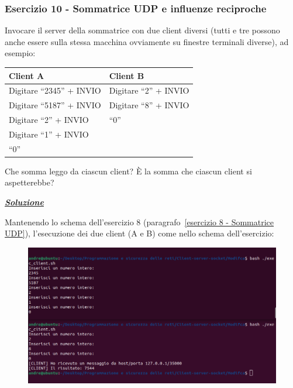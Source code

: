 \documentclass[a4paper]{article}
\newcommand{\dquotes}[1]{``#1''}
\begin{document}
	\subsubsection{Esercizio 10 - Sommatrice UDP e influenze reciproche}\label{esercizio 10 - Sommatrice UDP e influenze reciproche}
	
	Invocare il server della sommatrice con due client diversi (tutti e tre possono anche essere sulla stessa macchina ovviamente su finestre terminali diverse), ad esempio:
	\begin{table}[!htbp]
		\centering
		\begin{tabular}{@{} l | l @{}}
			\toprule
			\textbf{Client A} & \textbf{Client B} \\
			\midrule
			Digitare \dquotes{2345} + INVIO	& Digitare \dquotes{2} + INVIO 	\\
			Digitare \dquotes{5187} + INVIO	& Digitare \dquotes{8} + INVIO 	\\
			Digitare \dquotes{2} + INVIO	& \dquotes{0} 					\\
			Digitare \dquotes{1} + INVIO	& 								\\
			\dquotes{0}						&								\\
			\bottomrule
		\end{tabular}
	\end{table}
	
	\noindent
	Che somma leggo da ciascun client? È la somma che ciascun client si aspetterebbe?\newline
	
	\noindent
	\textcolor{Green4}{\textbf{\emph{\underline{Soluzione}}}}\newline
	
	\noindent
	Mantenendo lo schema dell'esercizio 8 (paragrafo~\ref{esercizio 8 - Sommatrice UDP}), l'esecuzione dei due client (A e B) come nello schema dell'esercizio:
	\begin{figure}[!htp]
		\centering
		\includegraphics[width=\textwidth]{img/soluzioni_TCP-UDP/TCP-UDP_5.png}
	\end{figure}
	
\end{document}
